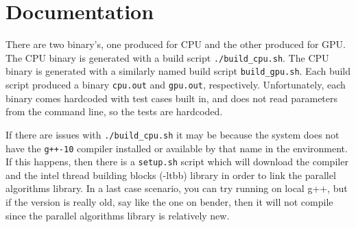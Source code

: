 \documentclass{article}
\begin{document}
\section{Documentation}
There are two binary's, one produced for CPU and the other produced for GPU. The CPU binary is generated with a build script \texttt{./build\_cpu.sh}. The CPU binary is generated with a similarly named build script \texttt{build\_gpu.sh}. Each build script produced a binary \texttt{cpu.out} and \texttt{gpu.out}, respectively. Unfortunately, each binary comes hardcoded with test cases built in, and does not read parameters from the command line, so the tests are hardcoded. 

If there are issues with \texttt{./build\_cpu.sh} it may be because the system does not have the \texttt{g++-10} compiler installed or available by that name in the environment. If this happens, then there is a \texttt{setup.sh} script which will download the compiler and the intel thread building blocks (-ltbb) library in order to link the parallel algorithms library. In a last case scenario, you can try running on local g++, but if the version is really old, say like the one on bender, then it will not compile since the parallel algorithms library is relatively new. 
\end{document}
